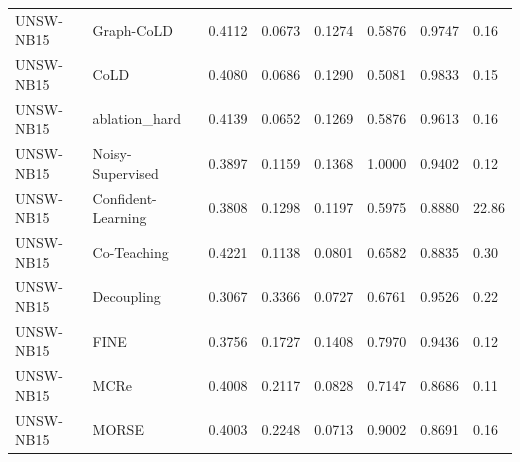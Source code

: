\begin{tabular}{llllllll}
UNSW-NB15 & Graph-CoLD & 0.4112 & 0.0673 & 0.1274 & 0.5876 & 0.9747 & 0.16 \\
UNSW-NB15 & CoLD & 0.4080 & 0.0686 & 0.1290 & 0.5081 & 0.9833 & 0.15 \\
UNSW-NB15 & ablation\_hard & 0.4139 & 0.0652 & 0.1269 & 0.5876 & 0.9613 & 0.16 \\
UNSW-NB15 & Noisy-Supervised & 0.3897 & 0.1159 & 0.1368 & 1.0000 & 0.9402 & 0.12 \\
UNSW-NB15 & Confident-Learning & 0.3808 & 0.1298 & 0.1197 & 0.5975 & 0.8880 & 22.86 \\
UNSW-NB15 & Co-Teaching & 0.4221 & 0.1138 & 0.0801 & 0.6582 & 0.8835 & 0.30 \\
UNSW-NB15 & Decoupling & 0.3067 & 0.3366 & 0.0727 & 0.6761 & 0.9526 & 0.22 \\
UNSW-NB15 & FINE & 0.3756 & 0.1727 & 0.1408 & 0.7970 & 0.9436 & 0.12 \\
UNSW-NB15 & MCRe & 0.4008 & 0.2117 & 0.0828 & 0.7147 & 0.8686 & 0.11 \\
UNSW-NB15 & MORSE & 0.4003 & 0.2248 & 0.0713 & 0.9002 & 0.8691 & 0.16 \\
\hline
\end{tabular}
